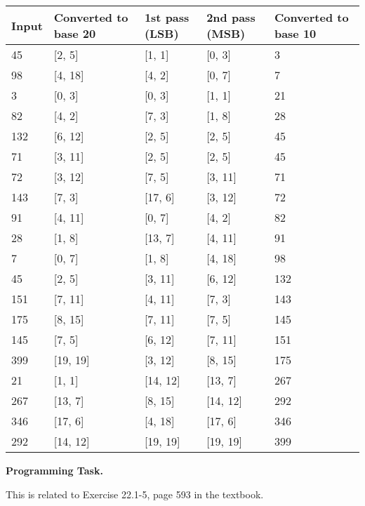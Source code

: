 \documentclass[11pt]{article}
\begin{document}
\begin{center}
\begin{tabular}{|p{7em}|p{7em}|p{7em}|p{7em}|p{7em}|} 
\hline
\textbf{Input} & \textbf{Converted to base 20} & \textbf{1st pass (LSB)} & \textbf{2nd pass (MSB)} & \textbf{Converted to base 10} \\ 

\hline
45   & [2, 5] & [1, 1] & [0, 3] & 3 \\
\hline
98   & [4, 18] & [4, 2] & [0, 7] & 7\\
\hline
3    & [0, 3] & [0, 3] & [1, 1] & 21\\
\hline
82   & [4, 2] & [7, 3] & [1, 8] & 28\\
\hline
132  & [6, 12] & [2, 5] & [2, 5] & 45\\
\hline
71   & [3, 11] & [2, 5] & [2, 5] & 45\\
\hline
72   & [3, 12] & [7, 5] & [3, 11] & 71 \\
\hline
143  & [7, 3] & [17, 6] & [3, 12] & 72\\
\hline
91   & [4, 11] & [0, 7] & [4, 2] & 82\\
\hline
28   & [1, 8] & [13, 7] & [4, 11] & 91 \\
\hline
7    & [0, 7] & [1, 8] & [4, 18] & 98\\
\hline
45   & [2, 5] & [3, 11] & [6, 12] & 132\\
\hline
151  & [7, 11] & [4, 11] & [7, 3] & 143\\
\hline
175  & [8, 15] & [7, 11] & [7, 5] & 145\\
\hline
145  & [7, 5] & [6, 12] & [7, 11] & 151\\
\hline
399  & [19, 19] & [3, 12] & [8, 15] & 175\\
\hline
21   & [1, 1] & [14, 12] & [13, 7] & 267\\
\hline
267  & [13, 7] & [8, 15] & [14, 12] & 292\\
\hline
346  & [17, 6] & [4, 18] & [17, 6] & 346\\
\hline
292  & [14, 12] & [19, 19] & [19, 19] & 399\\
\hline

\end{tabular}
\end{center}



\newpage




\textbf{Programming Task.}

 This is related to Exercise 22.1-5, page 593 in the textbook.  
\end{document}

